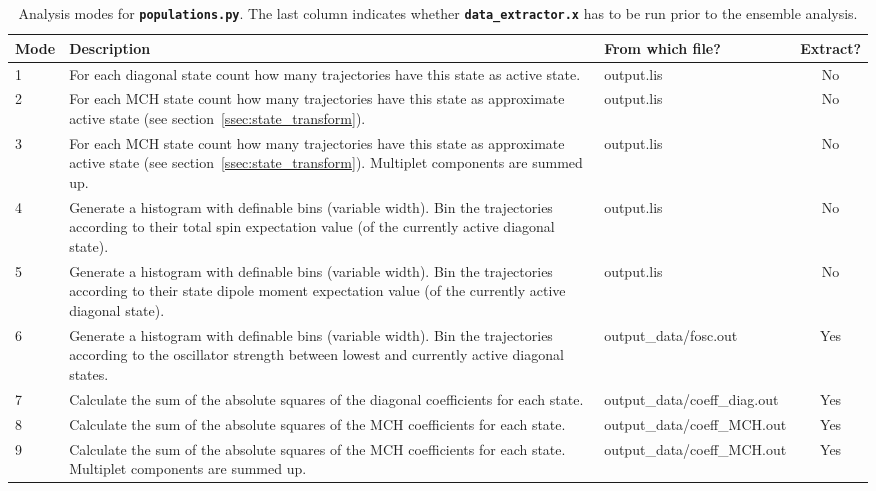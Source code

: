 \documentclass[a4paper,10pt,DIV=15,openany]{scrbook}
\newcommand{\ttt}[1]{\textbf{\texttt{#1}}}
\newcommand{\VEC}[1]{\ensuremath{\mathbf{#1}}}
\begin{document}
\begin{table}[tbp]
  \centering
  \caption[Analysis modes for \ttt{populations.py}.]{Analysis modes for \ttt{populations.py}. The last column indicates whether \ttt{data\_extractor.x} has to be run prior to the ensemble analysis.}
  \label{tab:Populations_modes}
  \begin{tabular}{lp{7.5cm}>{\ttfamily}lc}
    \hline
    Mode        &Description    &\rmfamily From which file?     &Extract?\\
    \hline
    1   &For each diagonal state count how many trajectories have this state as active state. &output.lis  &No\\
    2   &For each MCH state count how many trajectories have this state as approximate active state (see section~\ref{ssec:state_transform}). &output.lis  &No\\
    3   &For each MCH state count how many trajectories have this state as approximate active state (see section~\ref{ssec:state_transform}). Multiplet components are summed up. &output.lis  &No\\
    4   &Generate a histogram with definable bins (variable width). Bin the trajectories according to their total spin expectation value (of the currently active diagonal state).   &output.lis &No\\
    5   &Generate a histogram with definable bins (variable width). Bin the trajectories according to their state dipole moment expectation value (of the currently active diagonal state).   &output.lis &No\\
    6   &Generate a histogram with definable bins (variable width). Bin the trajectories according to the oscillator strength between lowest and currently active diagonal states.        &output\_data/fosc.out  &Yes\\
    7   &Calculate the sum of the absolute squares of the diagonal coefficients for each state.       &output\_data/coeff\_diag.out&Yes\\
    8   &Calculate the sum of the absolute squares of the MCH coefficients for each state.       &output\_data/coeff\_MCH.out&Yes\\
    9   &Calculate the sum of the absolute squares of the MCH coefficients for each state. Multiplet components are summed up.       &output\_data/coeff\_MCH.out&Yes\\

\end{tabular}
\end{table}
\end{document}
